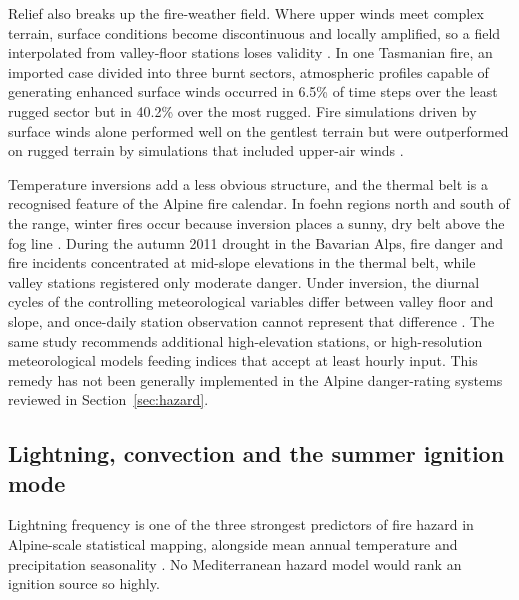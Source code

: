 \documentclass[11pt,a4paper]{article}
\begin{document}
Relief also breaks up the fire-weather field. Where upper winds meet complex terrain, surface conditions become discontinuous and locally amplified, so a field interpolated from valley-floor stations loses validity \citep{sharples_overview_2009}. In one Tasmanian fire, an imported case divided into three burnt sectors, atmospheric profiles capable of generating enhanced surface winds occurred in 6.5\% of time steps over the least rugged sector but in 40.2\% over the most rugged. Fire simulations driven by surface winds alone performed well on the gentlest terrain but were outperformed on rugged terrain by simulations that included upper-air winds \citep{ozaki_impact_2022}.

Temperature inversions add a less obvious structure, and the thermal belt is a recognised feature of the Alpine fire calendar. In foehn regions north and south of the range, winter fires occur because inversion places a sunny, dry belt above the fog line \citep{muller_forest_2020}. During the autumn 2011 drought in the Bavarian Alps, fire danger and fire incidents concentrated at mid-slope elevations in the thermal belt, while valley stations registered only moderate danger. Under inversion, the diurnal cycles of the controlling meteorological variables differ between valley floor and slope, and once-daily station observation cannot represent that difference \citep{schunk_forest_2013}. The same study recommends additional high-elevation stations, or high-resolution meteorological models feeding indices that accept at least hourly input. This remedy has not been generally implemented in the Alpine danger-rating systems reviewed in Section~\ref{sec:hazard}.

\subsection{Lightning, convection and the summer ignition mode}

Lightning frequency is one of the three strongest predictors of fire hazard in Alpine-scale statistical mapping, alongside mean annual temperature and precipitation seasonality \citep{gerberding_mapping_2025}. No Mediterranean hazard model would rank an ignition source so highly.
\end{document}
